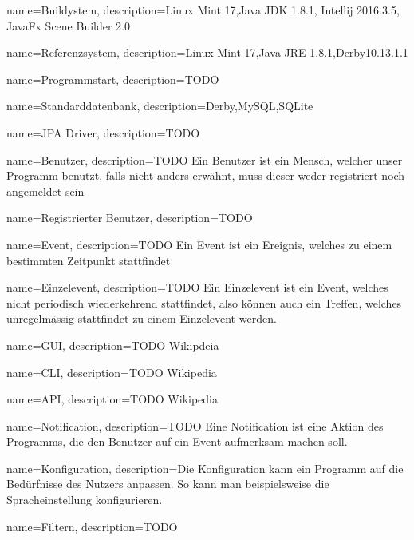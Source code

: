 
{
  name=Buildystem,
  description={Linux Mint 17,Java JDK 1.8.1, Intellij 2016.3.5, JavaFx Scene Builder 2.0}
} 

{
  name=Referenzsystem,
  description={Linux Mint 17,Java JRE 1.8.1,Derby10.13.1.1}
} 

{
  name=Programmstart,
  description={TODO}
} 


 
{
  name=Standarddatenbank,
  description={Derby,MySQL,SQLite}
} 


{
  name=JPA Driver,
  description={TODO}
} 

{
  name=Benutzer,
  description={TODO Ein Benutzer ist ein Mensch, welcher unser Programm benutzt, falls nicht anders erwähnt, muss dieser weder registriert noch angemeldet sein}
} 



{
  name=Registrierter Benutzer,
  description={TODO}
} 

{
  name=Event,
  description={TODO Ein Event ist ein Ereignis, welches zu einem bestimmten Zeitpunkt stattfindet}
} 

{
  name=Einzelevent,
  description={TODO Ein Einzelevent ist ein Event, welches nicht periodisch wiederkehrend stattfindet, also können auch
   ein Treffen, welches unregelmässig stattfindet zu einem Einzelevent werden.}
} 

{
  name=GUI,
  description={TODO Wikipdeia}
} 

{
  name=CLI,
  description={TODO Wikipedia}
} 

{
  name=API,
  description={TODO Wikipedia}
} 

{
  name=Notification,
  description={TODO Eine Notification ist eine Aktion des Programms, die den Benutzer auf ein Event aufmerksam machen soll.}
} 

{
  name=Konfiguration,
  description={Die Konfiguration kann ein Programm auf die Bedürfnisse des Nutzers anpassen. So kann man beispielsweise die Spracheinstellung konfigurieren.}
} 



{
  name=Filtern,
  description={TODO}
} 

